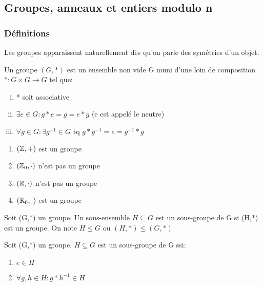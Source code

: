 \subsection{Groupes, anneaux et entiers modulo n}

\subsubsection{Définitions}

Les groupes apparaissent naturellement dès qu'on parle des symétries d'un objet. 

\begin{defn}
Un groupe $(G,*)$ est un ensemble non vide G muni d'une loin de composition $* : G \times G \rightarrow G$ tel que:

\begin{enumerate}[(i)]
\item * soit associative
\item $\exists e \in G: g*e = g = e*g$ (e est appelé le neutre)
\item $\forall g \in G: \exists g^{-1} \in G$ tq $g*g^{-1} = e = g^{-1}*g$
\end{enumerate}
\end{defn}

\begin{exmp}
	\begin{enumerate}
	\item $(\mathbb{Z},+)$ est un groupe
	\item $(\mathbb{Z}_0,\cdot)$ n'est pas un groupe
	\item $(\mathbb{R},\cdot)$ n'est pas un groupe
	\item $(\mathbb{R}_0,\cdot)$ est un groupe
	\end{enumerate}
\end{exmp}

\begin{defn}
Soit (G,*) un groupe. Un sous-ensemble $H \subseteq G$ est un sous-groupe de G si (H,*) est un groupe. On note $H \leq G$ ou $(H,*) \leq (G,*)$
\end{defn}

\newpage

\begin{prop}
Soit (G,*) un groupe. $H \subseteq G$ est un sous-groupe de G ssi:
	\begin{enumerate}
	\item $e \in H$
	\item $\forall g,h \in H: g*h^{-1} \in H$
	\end{enumerate} 
\end{prop}

